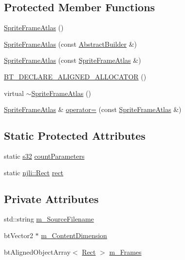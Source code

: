 \subsection*{Protected Member Functions}
\begin{DoxyCompactItemize}
\item 
\mbox{\hyperlink{classnjli_1_1_sprite_frame_atlas_a596bc53daef8f1de21fb018c04b5b71e}{Sprite\+Frame\+Atlas}} ()
\item 
\mbox{\hyperlink{classnjli_1_1_sprite_frame_atlas_a15a8fe9a69c63d560897562decfc55e2}{Sprite\+Frame\+Atlas}} (const \mbox{\hyperlink{classnjli_1_1_abstract_builder}{Abstract\+Builder}} \&)
\item 
\mbox{\hyperlink{classnjli_1_1_sprite_frame_atlas_a425671e7ea1cc989dd59d60865ec4792}{Sprite\+Frame\+Atlas}} (const \mbox{\hyperlink{classnjli_1_1_sprite_frame_atlas}{Sprite\+Frame\+Atlas}} \&)
\item 
\mbox{\hyperlink{classnjli_1_1_sprite_frame_atlas_a79e815f85949f9e26a982b87344b94b0}{B\+T\+\_\+\+D\+E\+C\+L\+A\+R\+E\+\_\+\+A\+L\+I\+G\+N\+E\+D\+\_\+\+A\+L\+L\+O\+C\+A\+T\+OR}} ()
\item 
virtual \mbox{\hyperlink{classnjli_1_1_sprite_frame_atlas_ab7e30efc622bb0b8d25e04ab41d1023c}{$\sim$\+Sprite\+Frame\+Atlas}} ()
\item 
\mbox{\hyperlink{classnjli_1_1_sprite_frame_atlas}{Sprite\+Frame\+Atlas}} \& \mbox{\hyperlink{classnjli_1_1_sprite_frame_atlas_a6b06945cf5b35035f89f032a784c7c63}{operator=}} (const \mbox{\hyperlink{classnjli_1_1_sprite_frame_atlas}{Sprite\+Frame\+Atlas}} \&)
\end{DoxyCompactItemize}
\subsection*{Static Protected Attributes}
\begin{DoxyCompactItemize}
\item 
static \mbox{\hyperlink{_util_8h_aa62c75d314a0d1f37f79c4b73b2292e2}{s32}} \mbox{\hyperlink{classnjli_1_1_sprite_frame_atlas_a8e1e4a08c88fe319fccddd4e34043016}{count\+Parameters}}
\item 
static \mbox{\hyperlink{classnjli_1_1_rect}{njli\+::\+Rect}} \mbox{\hyperlink{classnjli_1_1_sprite_frame_atlas_a85cbbab899666861a829c1cb06a03f87}{rect}}
\end{DoxyCompactItemize}
\subsection*{Private Attributes}
\begin{DoxyCompactItemize}
\item 
std\+::string \mbox{\hyperlink{classnjli_1_1_sprite_frame_atlas_a3b74d61cf8f45bdb16b7d17eacc9ec47}{m\+\_\+\+Source\+Filename}}
\item 
bt\+Vector2 $\ast$ \mbox{\hyperlink{classnjli_1_1_sprite_frame_atlas_acbe7fbc410b99d7a736dd06b56c9a1bf}{m\+\_\+\+Content\+Dimension}}
\item 
bt\+Aligned\+Object\+Array$<$ \mbox{\hyperlink{classnjli_1_1_rect}{Rect}} $>$ \mbox{\hyperlink{classnjli_1_1_sprite_frame_atlas_aa93f565817540b4d7d18f3a39cda90ad}{m\+\_\+\+Frames}}
\end{DoxyCompactItemize}
